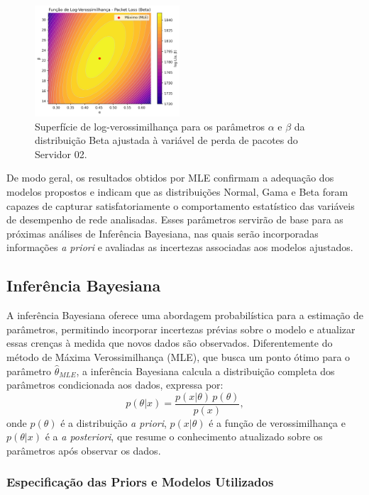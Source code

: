 \documentclass{article}
\begin{document}
\begin{figure}[htp]
	\centering
	\includegraphics[width=0.48\textwidth]{../figures/mle/packet_loss_loglik_surface_beta_server02.png}
	\caption{Superfície de log-verossimilhança para os parâmetros $\alpha$ e $\beta$ da distribuição Beta ajustada à variável de perda de pacotes do Servidor 02.}
	\label{fig:packet_loss_loglik_surface_beta_server02}
\end{figure}

De modo geral, os resultados obtidos por MLE confirmam a adequação dos modelos propostos
e indicam que as distribuições Normal, Gama e Beta foram capazes de capturar satisfatoriamente
o comportamento estatístico das variáveis de desempenho de rede analisadas.
Esses parâmetros servirão de base para as próximas análises de Inferência Bayesiana,
nas quais serão incorporadas informações \textit{a priori} e avaliadas as incertezas associadas
aos modelos ajustados.

\subsection{Inferência Bayesiana}

A inferência Bayesiana oferece uma abordagem probabilística para a estimação de parâmetros,
permitindo incorporar incertezas prévias sobre o modelo e atualizar essas crenças à medida
que novos dados são observados. Diferentemente do método de Máxima Verossimilhança (MLE),
que busca um ponto ótimo para o parâmetro $\hat{\theta}_{MLE}$, a inferência Bayesiana
calcula a distribuição completa dos parâmetros condicionada aos dados, expressa por:
\begin{equation}
	p(\theta | x) = \frac{p(x | \theta) \, p(\theta)}{p(x)},
\end{equation}
onde $p(\theta)$ é a distribuição \textit{a priori}, $p(x|\theta)$ é a função de
verossimilhança e $p(\theta|x)$ é a \textit{a posteriori}, que resume o conhecimento atualizado
sobre os parâmetros após observar os dados.

\subsubsection{Especificação das Priors e Modelos Utilizados}
\end{document}
